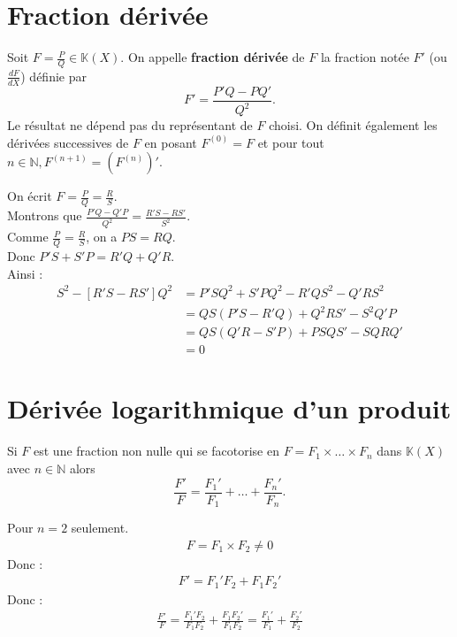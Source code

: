 \documentclass[../main.tex]{subfiles}
\begin{document}
\section{Fraction dérivée}
\begin{tcolorbox}[title=Définition 17.20, title filled=false, colframe=orange, colback=orange!10!white]
    Soit $F = \frac{P}{Q} \in \mathbb{K}(X)$. On appelle \textbf{fraction dérivée} de $F$ la fraction notée $F'$ (ou $\frac{dF}{dX}$) définie par
    $$F' = \frac{P'Q - PQ'}{Q^2}.$$
    Le résultat ne dépend pas du représentant de $F$ choisi. On définit également les dérivées successives de $F$ en posant $F^(0) = F$ et pour tout $n \in \mathbb{N}, F^{(n+1)} = (F^{(n)})'$.
\end{tcolorbox}

\noindent On écrit $F = \frac{P}{Q} = \frac{R}{S}$. \\
Montrons que $\frac{P'Q - Q'P}{Q^2} = \frac{R'S - RS'}{S^2}$. \\
Comme $\frac{P}{Q} = \frac{R}{S}$, on a $PS = RQ$. \\
Donc $P'S + S'P = R'Q + Q'R$. \\
Ainsi : 
\begin{align*}
    [P'Q - PQ']S^2 - [R'S - RS']Q^2 &= P'SQ^2 + S'PQ^2 - R'QS^2 - Q'RS^2 \\
    &= QS(P'S - R'Q) + Q^2 RS' - S^2 Q'P \\
    &= QS (Q'R - S'P) + PSQS' - SQRQ' \\
    &= 0
\end{align*}

\section{Dérivée logarithmique d'un produit}
\begin{tcolorbox}[title=Théorème 17.24, title filled=false, colframe=orange, colback=orange!10!white]
    Si $F$ est une fraction non nulle qui se facotorise en $F = F_1 \times \ldots \times F_n$ dans $\mathbb{K}(X)$ avec $n \in \mathbb{N}$ alors
    $$\frac{F'}{F} = \frac{F_1'}{F_1} + \ldots + \frac{F_n'}{F_n}.$$
\end{tcolorbox}

\noindent Pour $n = 2$ seulement. \\
\begin{align*}
    F = F_1 \times F_2 \neq 0
\end{align*}
Donc :
\begin{align*}
    F' = F_1'F_2 + F_1F_2'
\end{align*}
Donc :
\begin{align*}
    \frac{F'}{F} = \frac{F_1'F_2}{F_1F_2} + \frac{F_1F_2'}{F_1F_2} = \frac{F_1'}{F_1} + \frac{F_2'}{F_2}
\end{align*}
\end{document}
